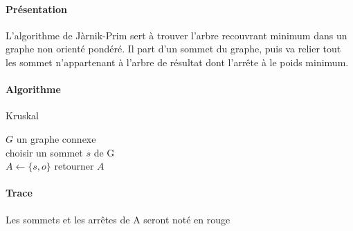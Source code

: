 \documentclass[a4paper,12pt]{article}
\begin{document}
\paragraph{Présentation}
L'algorithme de Jàrnik-Prim sert à trouver l'arbre recouvrant minimum dans un graphe non orienté pondéré.
Il part d'un sommet du graphe, puis va relier tout les sommet n'appartenant à l'arbre de résultat dont l'arrête à le poids minimum.

\paragraph{Algorithme}\hfill
\begin{algorithm}
\caption{Kruskal}
$G$ un graphe connexe\\
choisir un sommet $s$ de G\\
$A \gets \{s, o\}$\;
retourner $A$
\end{algorithm}

\paragraph{Trace}
Les sommets et les arrêtes de A seront noté en rouge\\
\end{document}
